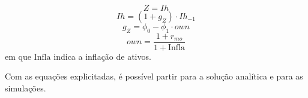 \begin{equation}
\label{_Z}
    Z = Ih
\end{equation}
\begin{equation}
    Ih = (1 + g_Z)\cdot Ih_{-1}
\end{equation}
\begin{equation}
g_Z = \phi_0 - \phi_1\cdot own
\end{equation}
\begin{equation}
own = \frac{1+r_{mo}}{1+\text{Infla}}
\end{equation}
em que $\text{Infla}$ indica a inflação de ativos. 
\begin{comment}
Adicionalmente, seguindo a exposição de \textcite{leamer_housing_2007}, o estoque de imóveis determina o acesso ao crédito com certa defasagem $\tau$ de modo que:
\begin{equation}
N = \Theta\cdot \Delta Khn_{-\tau}\cdot p_{h_{-\tau}}
\end{equation}
com $\Theta$ representando um parâmetro e $Khn$ sendo o estoque de imóveis nominal. 
\end{comment}
Com as equações explicitadas, é possível partir para a solução analítica e para as simulações. 
